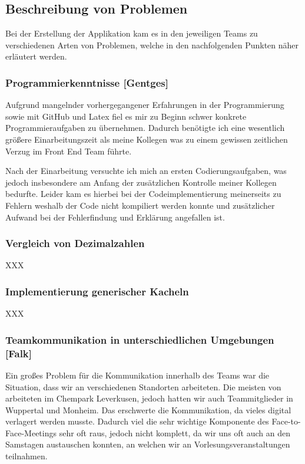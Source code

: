 \clearpage

\subsection{Beschreibung von Problemen}

Bei der Erstellung der Applikation kam es in den jeweiligen Teams zu verschiedenen Arten von Problemen, welche in den nachfolgenden Punkten näher erläutert werden.

\subsubsection{Programmierkenntnisse [Gentges]}

Aufgrund mangelnder vorhergegangener Erfahrungen in der Programmierung sowie mit GitHub und Latex fiel es mir zu Beginn schwer konkrete Programmieraufgaben zu übernehmen. Dadurch benötigte ich eine wesentlich größere Einarbeitungszeit als meine Kollegen was zu einem gewissen zeitlichen Verzug im Front End Team führte.

Nach der Einarbeitung versuchte ich mich an ersten Codierungsaufgaben, was jedoch insbesondere am Anfang der zusätzlichen Kontrolle meiner Kollegen bedurfte. 
Leider kam es hierbei bei der Codeimplementierung meinerseits zu Fehlern weshalb der Code nicht kompiliert werden konnte und zusätzlicher Aufwand bei der Fehlerfindung und Erklärung angefallen ist. 

\subsubsection{Vergleich von Dezimalzahlen}

XXX

\subsubsection{Implementierung generischer Kacheln}

XXX

\subsubsection{Teamkommunikation in unterschiedlichen Umgebungen [Falk]}

Ein großes Problem für die Kommunikation innerhalb des Teams war die Situation, dass wir an verschiedenen Standorten arbeiteten. Die meisten von arbeiteten im Chempark Leverkusen, jedoch hatten wir auch Teammitglieder in Wuppertal und Monheim. Das erschwerte die Kommunikation, da vieles digital verlagert werden musste. Dadurch viel die sehr wichtige Komponente des Face-to-Face-Meetings sehr oft raus, jedoch nicht komplett, da wir uns oft auch an den Samstagen austauschen konnten, an welchen wir an Vorlesungsveranstaltungen teilnahmen. 

